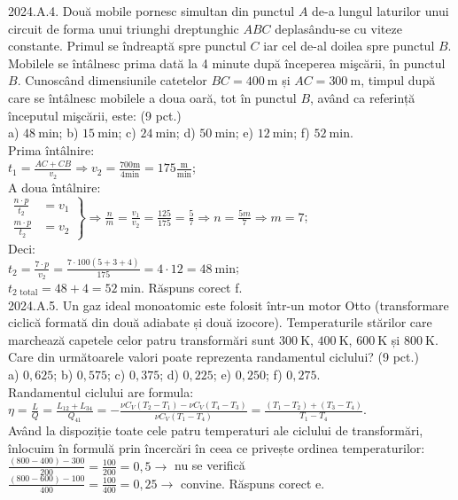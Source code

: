 2024.A.4. Două mobile pornesc simultan din punctul $A$ de-a lungul laturilor unui circuit de forma unui triunghi dreptunghic $A B C$ deplasându-se cu viteze constante. Primul se îndreaptă spre punctul $C$ iar cel de-al doilea spre punctul $B$. Mobilele se întâlnesc prima dată la 4 minute după începerea mişcării, în punctul $B$. Cunoscând dimensiunile catetelor $B C=400 \mathrm{~m}$ și $A C=300 \mathrm{~m}$, timpul după care se întâlnesc mobilele a doua oară, tot în punctul $B$, având ca referință începutul mişcării, este: (9 pct.)\\ a) $48 \mathrm{~min}$; b) $15 \mathrm{~min}$; c) $24 \mathrm{~min}$; d) $50 \mathrm{~min}$; e) $12 \mathrm{~min}$; f) $52 \mathrm{~min}$.\\ Prima întâlnire:\\ $t_{1}=\frac{A C+C B}{v_{2}} \Rightarrow v_{2}=\frac{700 \mathrm{m}}{4 \mathrm{min} }=175 \frac{\mathrm{m}}{\mathrm{min}}$;\\ A doua întâlnire:\\ $\left.\begin{array}{rl}\frac{n \cdot p}{t_{2}} & =v_{1} \\ \frac{m \cdot p}{t_{2}} & =v_{2}\end{array}\right\} \Rightarrow \frac{n}{m}=\frac{v_{1}}{v_{2}}=\frac{125}{175}=\frac{5}{7} \Rightarrow n=\frac{5 m}{7} \Rightarrow m=7$;\\ Deci:\\ $t_{2}=\frac{7 \cdot p}{v_{2}}=\frac{7 \cdot 100(5+3+4)}{175}=4 \cdot 12=48 \mathrm{~min}$;\\ $t_{2 \text { total}}=48+4=52 \mathrm{~min}$. Răspuns corect f.\\

2024.A.5. Un gaz ideal monoatomic este folosit într-un motor Otto (transformare ciclică formată din două adiabate și două izocore). Temperaturile stărilor care marchează capetele celor patru transformări sunt $300 \mathrm{~K}$, $400 \mathrm{~K}$, $600 \mathrm{~K}$ și $800 \mathrm{~K}$. Care din următoarele valori poate reprezenta randamentul ciclului? (9 pct.)\\ a) $0,625$; b) $0,575$; c) $0,375$; d) $0,225$; e) $0,250$; f) $0,275$.\\ Randamentul ciclului are formula:\\ $\eta=\frac{L}{Q}=\frac{L_{12}+L_{34}}{Q_{41}}=-\frac{\nu C_{V}\left(T_{2}-T_{1}\right)-\nu C_{V}\left(T_{4}-T_{3}\right)}{\nu C_{V}\left(T_{1}-T_{4}\right)}=\frac{\left(T_{1}-T_{2}\right)+\left(T_{3}-T_{4}\right)}{T_{1}-T_{4}}$.\\ Având la dispoziție toate cele patru temperaturi ale ciclului de transformări, înlocuim în formulă prin încercări în ceea ce privește ordinea temperaturilor:\\ $\frac{(800-400)-300}{200}=\frac{100}{200}=0,5 \rightarrow$ nu se verifică\\ $\frac{(800-600)-100}{400}=\frac{100}{400}=0,25 \rightarrow$ convine. Răspuns corect e.\\

